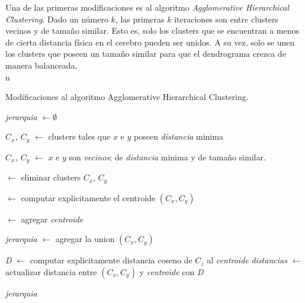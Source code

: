 Una de las primeras modificaciones es al algoritmo \textit{Agglomerative
Hierarchical Clustering}. Dado un n\'umero $k$, las primeras $k$ iteraciones son
entre clusters vecinos y de tama\~no similar. Esto es, solo los clusters que se
encuentran a menos de cierta distancia f\'isica en el cerebro pueden ser unidos.
A su vez, solo se unen los clusters que poseen un tama\~no similar para que el
dendrograma crezca de manera balanceada. \\n


\settowidth{}
\addtolength\mylen{\parindent}

\begin{algorithm}[h]
\caption{Modificaciones al algoritmo Agglomerative Hierarchical Clustering.}
\label{alg:morenoahc}
\begin{algorithmic}[1]

                      
    \State \emph{jerarquia} $\gets \emptyset$
                      


        \State \emph{$C_x$, $C_y$} $\gets$ clusters tales que $x$ e $y$ poseen \emph{distancia} minima      
            
    \Else{}

        \State \emph{$C_x$, $C_y$} $\gets$ $x$ e $y$ son \emph{vecinos}; 
                                   de \emph{distancia} minima y de tama\~no similar.

    \EndIf
    
     $\gets$ eliminar clusters $C_x$, $C_y$

     $\gets$ computar explicitamente el centroide $(C_x,C_y)$ 

     $\gets$ agregar \emph{centroide}
    
    \State \emph{jerarquia} $\gets$ agregar la union $(C_x,C_y)$
    
        \State \emph{D} $\gets$ computar explicitamente distancia coseno de $C_z$ al \emph{centroide}
        \State \emph{distancias} $\gets$ actualizar distancia entre $(C_x,C_y)$ y \emph{centroide} con \emph{D}
    \EndFor            
    
\EndFor

\State \Return \emph{jerarquia} 
 
\EndProcedure 

\end{algorithmic}
\end{algorithm}


